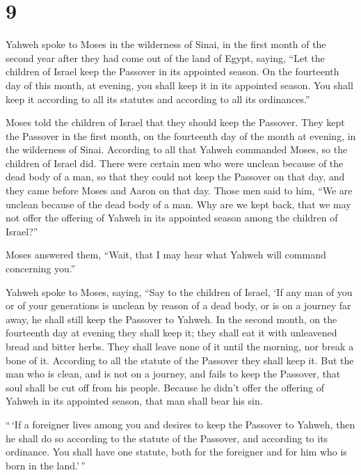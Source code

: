 \hypertarget{section-8}{%
\section{9}\label{section-8}}

 Yahweh spoke to Moses in the wilderness of Sinai, in the
first month of the second year after they had come out of the land of
Egypt, saying,  ``Let the children of Israel keep the
Passover in its appointed season.  On the fourteenth day of
this month, at evening, you shall keep it in its appointed season. You
shall keep it according to all its statutes and according to all its
ordinances.''

 Moses told the children of Israel that they should keep the
Passover.  They kept the Passover in the first month, on the
fourteenth day of the month at evening, in the wilderness of Sinai.
According to all that Yahweh commanded Moses, so the children of Israel
did.  There were certain men who were unclean because of the
dead body of a man, so that they could not keep the Passover on that
day, and they came before Moses and Aaron on that day. 
Those men said to him, ``We are unclean because of the dead body of a
man. Why are we kept back, that we may not offer the offering of Yahweh
in its appointed season among the children of Israel?''

 Moses answered them, ``Wait, that I may hear what Yahweh
will command concerning you.''

 Yahweh spoke to Moses, saying,  ``Say to the
children of Israel, `If any man of you or of your generations is unclean
by reason of a dead body, or is on a journey far away, he shall still
keep the Passover to Yahweh.  In the second month, on the
fourteenth day at evening they shall keep it; they shall eat it with
unleavened bread and bitter herbs.  They shall leave none
of it until the morning, nor break a bone of it. According to all the
statute of the Passover they shall keep it.  But the man
who is clean, and is not on a journey, and fails to keep the Passover,
that soul shall be cut off from his people. Because he didn't offer the
offering of Yahweh in its appointed season, that man shall bear his sin.

 ``\,`If a foreigner lives among you and desires to keep
the Passover to Yahweh, then he shall do so according to the statute of
the Passover, and according to its ordinance. You shall have one
statute, both for the foreigner and for him who is born in the
land.'\,''

